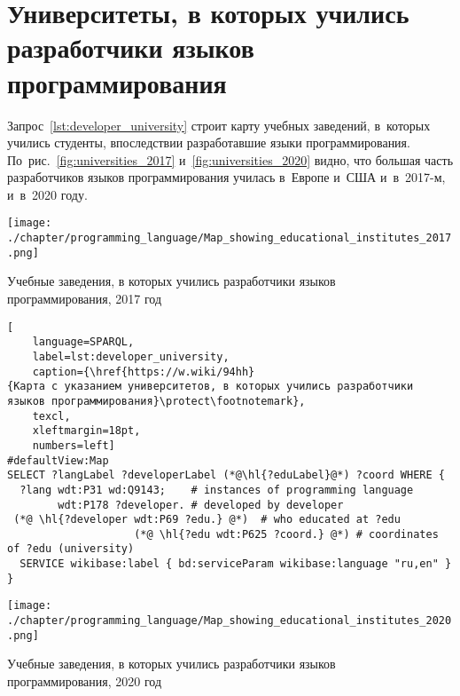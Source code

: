 \section{Университеты, в которых учились разработчики языков программирования}

Запрос~\ref{lst:developer_university} строит карту учебных заведений, 
в~которых учились студенты, впоследствии разработавшие языки программирования. 
По~рис.~\ref{fig:universities_2017} и~\ref{fig:universities_2020} видно, 
что большая часть разработчиков языков программирования училась 
в~Европе и~США и~в~2017-м, и~в~2020 году.
%
\begin{marginfigure}[3\baselineskip]
\centering
	\texttt{[image: ./chapter/programming\_language/Map\_showing\_educational\_institutes\_2017.png]}
    \vspace{-12pt}
	\caption[Учебные заведения, в которых учились разработчики языков программирования, 2017 год.]
    {Учебные заведения, в которых учились разработчики языков\\программирования, 2017 год}
	\label{fig:universities_2017}
\end{marginfigure}


\begin{lstlisting}[
    language=SPARQL,
    label=lst:developer_university,
    caption={\href{https://w.wiki/94hh}
{Карта с указанием университетов, в которых учились разработчики языков программирования}\protect\footnotemark},
    texcl,
    xleftmargin=18pt,
    numbers=left]
#defaultView:Map
SELECT ?langLabel ?developerLabel (*@\hl{?eduLabel}@*) ?coord WHERE {
  ?lang wdt:P31 wd:Q9143;    # instances of programming language
        wdt:P178 ?developer. # developed by developer
 (*@ \hl{?developer wdt:P69 ?edu.} @*)  # who educated at ?edu
                    (*@ \hl{?edu wdt:P625 ?coord.} @*) # coordinates of ?edu (university)
  SERVICE wikibase:label { bd:serviceParam wikibase:language "ru,en" }
}
\end{lstlisting}


\begin{marginfigure}[1\baselineskip]
\centering
	\texttt{[image: ./chapter/programming\_language/Map\_showing\_educational\_institutes\_2020.png]}
    \vspace{-12pt}
	\caption[Учебные заведения, в которых учились разработчики языков программирования, 2020 год.]
    {Учебные заведения, в которых учились разработчики языков\\программирования, 2020 год}
	\label{fig:universities_2020}
\end{marginfigure}


